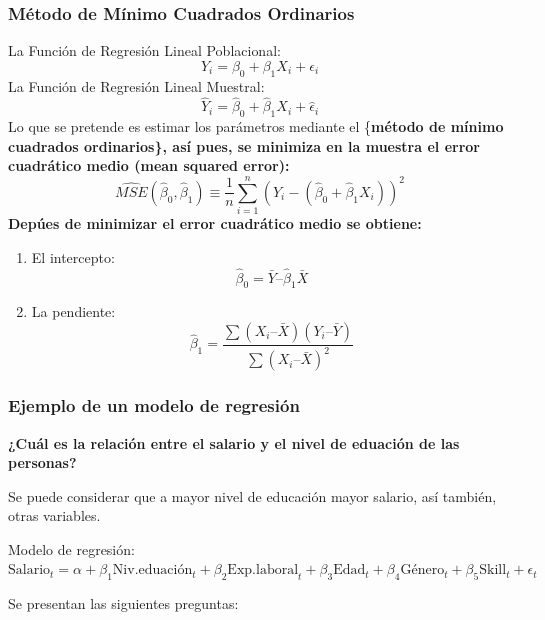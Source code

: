\documentclass[
]{book}
\providecommand{\tightlist}{%
  \setlength{\itemsep}{0pt}\setlength{\parskip}{0pt}}
\begin{document}
\hypertarget{muxe9todo-de-muxednimo-cuadrados-ordinarios}{%
\subsubsection{Método de Mínimo Cuadrados Ordinarios}\label{muxe9todo-de-muxednimo-cuadrados-ordinarios}}

La Función de Regresión Lineal Poblacional:
\[Y_i = \beta_0 + \beta_1 X_i + \epsilon_i \]
La Función de Regresión Lineal Muestral:
\[\hat{Y}_i = \hat{\beta}_0 + \hat{\beta}_1 X_i + \hat{\epsilon}_i\]
Lo que se pretende es estimar los parámetros mediante el \{\bf método de mínimo cuadrados ordinarios\}, así pues, se minimiza en la muestra el error cuadrático medio (mean squared error):
\[\widehat{MSE}(\hat{\beta}_0, \hat{\beta}_1) \equiv \frac{1}{n}\sum_{i=1}^{n}{(Y_i - (\hat{\beta}_0 + \hat{\beta}_1 X_i))^2}\]
Depúes de minimizar el error cuadrático medio se obtiene:

\begin{enumerate}
\def\labelenumi{\arabic{enumi}.}
\tightlist
\item
  El intercepto:
  \[\hat{\beta}_0 = \bar{Y} – \hat{\beta}_1 \bar{X}\]
\item
  La pendiente:
  \[\hat{\beta}_1 = \frac{\sum(X_i – \bar{X}) (Y_i – \bar{Y})} {\sum(X_i – \bar{X})^2}\]
\end{enumerate}

\hypertarget{ejemplo-de-un-modelo-de-regresiuxf3n}{%
\subsubsection{Ejemplo de un modelo de regresión}\label{ejemplo-de-un-modelo-de-regresiuxf3n}}

\textbf{¿Cuál es la relación entre el salario y el nivel de eduación de las personas?}

Se puede considerar que a mayor nivel de educación mayor salario, así también, otras variables.

Modelo de regresión:
\(\mathrm{Salario}_{t}=\alpha+\beta_{1}\mathrm{Niv.eduación}_{t}+\beta_{2}\mathrm{Exp.laboral}_{t}+\beta_{3} \mathrm{Edad}_{t}+\beta_{4}\mathrm{Género}_{t}+\beta_{5}\mathrm{Skill}_{t}+\epsilon_{t}\)

Se presentan las siguientes preguntas:
\end{document}
